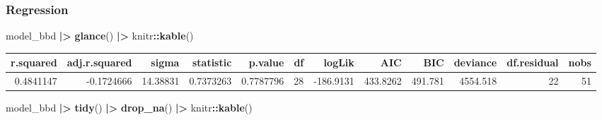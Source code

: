 \documentclass[
  paper=a4,
  ,captions=tableheading
]{scrartcl}
\newenvironment{Shaded}{\begin{snugshade}}{\end{snugshade}}
\newcommand{\ErrorTok}[1]{\textcolor[rgb]{0.64,0.00,0.00}{\textbf{#1}}}
\newcommand{\KeywordTok}[1]{\textcolor[rgb]{0.13,0.29,0.53}{\textbf{#1}}}
\newcommand{\NormalTok}[1]{#1}
\newcommand{\OperatorTok}[1]{\textcolor[rgb]{0.81,0.36,0.00}{\textbf{#1}}}
\newcommand{\StringTok}[1]{\textcolor[rgb]{0.31,0.60,0.02}{#1}}
\begin{document}
\hypertarget{regression-1}{%
\subsubsection{Regression}\label{regression-1}}

\begin{Shaded}
\begin{Highlighting}[]
\NormalTok{model_bbd }\OperatorTok{|}\ErrorTok{>}\StringTok{ }
\StringTok{  }\KeywordTok{glance}\NormalTok{() }\OperatorTok{|}\ErrorTok{>}\StringTok{ }
\StringTok{  }\NormalTok{knitr}\OperatorTok{::}\KeywordTok{kable}\NormalTok{()}
\end{Highlighting}
\end{Shaded}

\begin{tabular}{r|r|r|r|r|r|r|r|r|r|r|r}
\hline
r.squared & adj.r.squared & sigma & statistic & p.value & df & logLik & AIC & BIC & deviance & df.residual & nobs\\
\hline
0.4841147 & -0.1724666 & 14.38831 & 0.7373263 & 0.7787796 & 28 & -186.9131 & 433.8262 & 491.781 & 4554.518 & 22 & 51\\
\hline
\end{tabular}

\begin{Shaded}
\begin{Highlighting}[]
\NormalTok{model_bbd }\OperatorTok{|}\ErrorTok{>}\StringTok{ }
\StringTok{  }\KeywordTok{tidy}\NormalTok{() }\OperatorTok{|}\ErrorTok{>}
\StringTok{  }\KeywordTok{drop_na}\NormalTok{() }\OperatorTok{|}\ErrorTok{>}\StringTok{ }
\StringTok{  }\NormalTok{knitr}\OperatorTok{::}\KeywordTok{kable}\NormalTok{()}
\end{Highlighting}
\end{Shaded}
\end{document}
